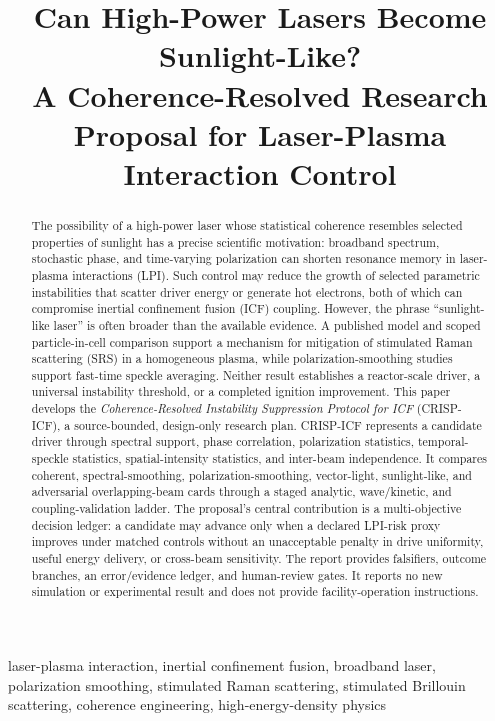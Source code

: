 \documentclass[conference]{../../../../Conference-LaTeX-template_10-17-19/IEEEtran}
\title{Can High-Power Lasers Become Sunlight-Like?\\A Coherence-Resolved Research Proposal for Laser-Plasma Interaction Control}
\author{\IEEEauthorblockN{Anonymous Research Proposal}}
\begin{document}
\maketitle

\begin{abstract}
The possibility of a high-power laser whose statistical coherence resembles selected properties of sunlight has a precise scientific motivation: broadband spectrum, stochastic phase, and time-varying polarization can shorten resonance memory in laser-plasma interactions (LPI). Such control may reduce the growth of selected parametric instabilities that scatter driver energy or generate hot electrons, both of which can compromise inertial confinement fusion (ICF) coupling. However, the phrase ``sunlight-like laser'' is often broader than the available evidence. A published model and scoped particle-in-cell comparison support a mechanism for mitigation of stimulated Raman scattering (SRS) in a homogeneous plasma, while polarization-smoothing studies support fast-time speckle averaging. Neither result establishes a reactor-scale driver, a universal instability threshold, or a completed ignition improvement. This paper develops the \emph{Coherence-Resolved Instability Suppression Protocol for ICF} (CRISP-ICF), a source-bounded, design-only research plan. CRISP-ICF represents a candidate driver through spectral support, phase correlation, polarization statistics, temporal-speckle statistics, spatial-intensity statistics, and inter-beam independence. It compares coherent, spectral-smoothing, polarization-smoothing, vector-light, sunlight-like, and adversarial overlapping-beam cards through a staged analytic, wave/kinetic, and coupling-validation ladder. The proposal's central contribution is a multi-objective decision ledger: a candidate may advance only when a declared LPI-risk proxy improves under matched controls without an unacceptable penalty in drive uniformity, useful energy delivery, or cross-beam sensitivity. The report provides falsifiers, outcome branches, an error/evidence ledger, and human-review gates. It reports no new simulation or experimental result and does not provide facility-operation instructions.
\end{abstract}

\begin{IEEEkeywords}
laser-plasma interaction, inertial confinement fusion, broadband laser, polarization smoothing, stimulated Raman scattering, stimulated Brillouin scattering, coherence engineering, high-energy-density physics
\end{IEEEkeywords}
\end{document}

